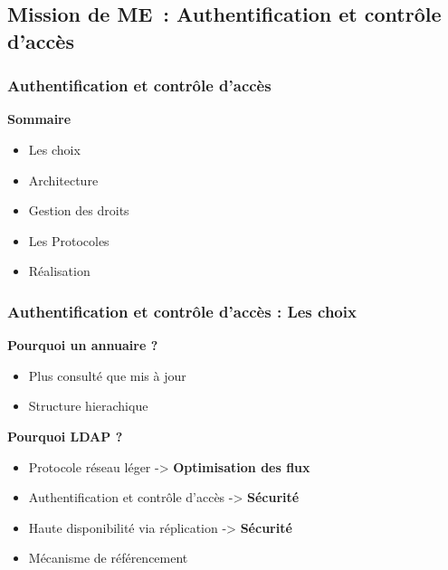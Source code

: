 \subsection{Mission de ME~: Authentification et contrôle d'accès}
\begin{frame}
\tableofcontents[subsectionstyle=show/shaded/hide, subsubsectionstyle=hide, sectionstyle=show/hide]
\end{frame}
\begin{frame}
  \frametitle{Authentification et contrôle d'accès}
  \begin{block}{\textbf{ Sommaire }}
  \begin{itemize}
  \item Les choix
  \item Architecture
  \item Gestion des droits
  \item Les Protocoles
  \item Réalisation
  \end{itemize}
  \end{block}
\end{frame}

\begin{frame}
  \frametitle{Authentification et contrôle d'accès : Les choix}
  \begin{block}{\textbf{Pourquoi un annuaire ? }}
  \begin{itemize}
  \item Plus consulté que mis à jour
  \item Structure hierachique 
  \end{itemize} 
  \end{block}
  
  \pause \begin{block}{\textbf{Pourquoi LDAP ? }}
  \begin{itemize}
  \item Protocole réseau léger -> \textbf{Optimisation des flux
}
  \item Authentification et contrôle d'accès -> \textbf{Sécurité}
  \item Haute disponibilité via réplication  -> \textbf{Sécurité}
  \item Mécanisme de référencement
  \end{itemize}
  \end{block}
\end{frame}

